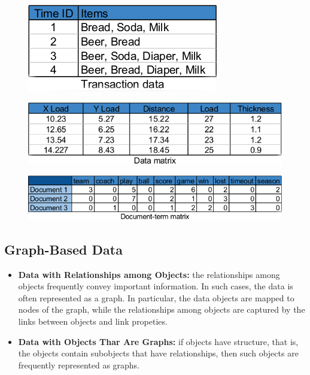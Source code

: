 		\begin{figure}[H]
			\centering
			\includegraphics[scale=0.5]{pics/transactionData.png}
		\end{figure}

		\begin{figure}[H]
			\centering
			\includegraphics[scale=0.5]{pics/dataMatrix.png}
		\end{figure}

		\begin{figure}[H]
			\centering
			\includegraphics[scale=0.5]{pics/DocumentTermMatrix.png}
		\end{figure}

		\subsection*{Graph-Based Data}
			\begin{itemize}
				\item {\bf Data with Relationships among Objects:} the relationships among objects frequently convey important information. In such cases, the data is often represented as a graph. In 
				particular, the data objects are mapped to nodes of the graph, while the relationships among
				objects are captured by the links between objects and link propeties. 
				\item {\bf Data with Objects Thar Are Graphs:} if objects have structure, that is, the objects
				contain subobjects that have relationships, then such objects are frequently represented as graphs.
			\end{itemize}

